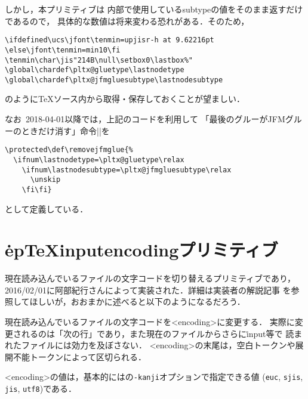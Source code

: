 \documentclass[a4paper,11pt,nomag]{jsarticle}
\begin{document}
しかし，本プリミティブは
\epTeX 内部で使用しているsubtypeの値をそのまま返すだけであるので，
具体的な数値は将来変わる恐れがある．そのため，
\begin{verbatim}
\ifdefined\ucs\jfont\tenmin=upjisr-h at 9.62216pt
\else\jfont\tenmin=min10\fi
\tenmin\char\jis"214B\null\setbox0\lastbox%"
\global\chardef\pltx@gluetype\lastnodetype
\global\chardef\pltx@jfmgluesubtype\lastnodesubtype
\end{verbatim}
のように\TeX ソース内から取得・保存しておくことが望ましい．

\medskip
なお\pLaTeX~2018-04-01以降では，上記のコードを利用して
「最後のグルーがJFMグルーのときだけ消す」命令|\removejfmglue|を
\begin{verbatim}
\protected\def\removejfmglue{%
  \ifnum\lastnodetype=\pltx@gluetype\relax
    \ifnum\lastnodesubtype=\pltx@jfmgluesubtype\relax
      \unskip
    \fi\fi}
\end{verbatim}
として定義している．

\section{\.{epTeXinputencoding}プリミティブ}
現在読み込んでいるファイルの文字コードを切り替えるプリミティブであり，
2016/02/01に阿部紀行さんによって実装された．詳細は実装者の解説記事
\cite{eptexinputenc}を参照してほしいが，おおまかに述べると以下のようになるだろう．

\begin{cslist}
  現在読み込んでいるファイルの文字コードを<encoding>に変更する．
  実際に変更されるのは「次の行」であり，また現在のファイルからさらに\.{input}等で
  読まれたファイルには効力を及ぼさない．
  <encoding>の末尾は，空白トークンや展開不能トークンによって区切られる．

  <encoding>の値は，基本的には\pTeX の\texttt{-kanji}オプションで指定できる値
  (\texttt{euc}, \texttt{sjis}, \texttt{jis}, \texttt{utf8})である．
\end{cslist}
\end{document}
